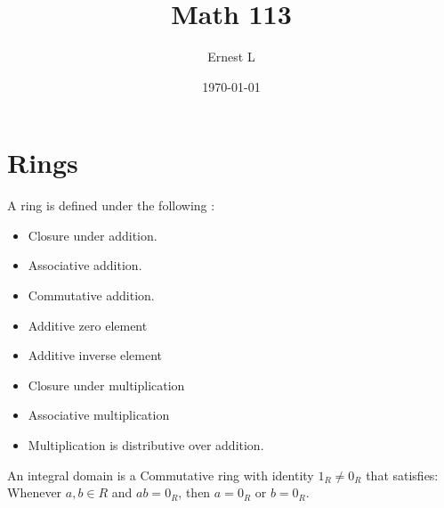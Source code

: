 \documentclass[11pt]{article}
\author{Ernest L}
\date{\today}
\title{Math 113}
\begin{document}
\maketitle
\section{Rings}

\begin{definition}
    A ring is defined under the following :
    \begin{itemize}
        \item
        Closure under addition.
        \item
        Associative addition.
        \item
        Commutative addition.
        \item
        Additive zero element
        \item
        Additive inverse element
        \item
        Closure under multiplication
        \item
        Associative multiplication  
        \item
        Multiplication is distributive over addition.
    \end{itemize}
\end{definition}

\begin{definition}
    An integral domain is a Commutative ring with identity $1_R \ne 0_R$ that satisfies: Whenever $a, b \in R$ and $ab = 0_R$, then $a = 0_R$ or $b = 0_R$.
\end{definition}
    
\end{document}
